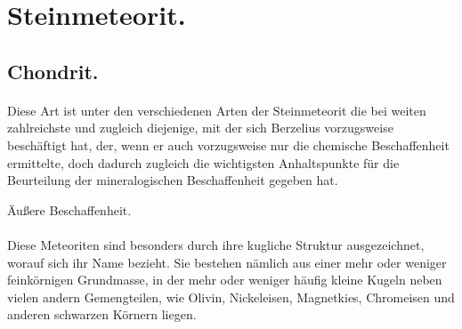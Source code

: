 \documentclass[a4paper, 11pt, oneside]{article}
\begin{document}
\section{Steinmeteorit.}
\subsection{Chondrit.}
\paragraph{}
Diese Art ist unter den verschiedenen Arten der Steinmeteorit die bei weiten zahlreichste und zugleich diejenige, mit der sich Berzelius vorzugsweise beschäftigt hat, der, wenn er auch vorzugsweise nur die chemische Beschaffenheit ermittelte, doch dadurch zugleich die wichtigsten Anhaltspunkte für die Beurteilung der mineralogischen Beschaffenheit gegeben hat.
\begin{center}
Äußere Beschaffenheit.
\end{center}
\paragraph{}
Diese Meteoriten sind besonders durch ihre kugliche Struktur ausgezeichnet, worauf sich ihr Name bezieht. Sie bestehen nämlich aus einer mehr oder weniger feinkörnigen Grundmasse, in der mehr oder weniger häufig kleine Kugeln neben vielen andern Gemengteilen, wie Olivin, Nickeleisen, Magnetkies, Chromeisen und anderen schwarzen Körnern liegen.
\end{document}
